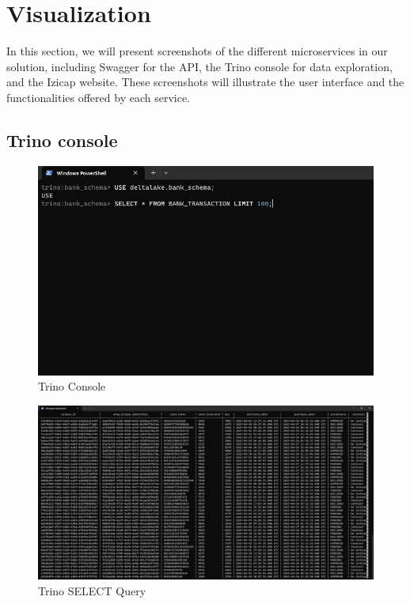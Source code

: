 \section{Visualization}

In this section, we will present screenshots of the different microservices in our solution, including Swagger for the API, the Trino console for data exploration, and the Izicap website. These screenshots will illustrate the user interface and the functionalities offered by each service.

\subsection{Trino console}

\begin{figure}[H]
\centering
\includegraphics[width=\linewidth]{images/trino-1.png}
\caption{Trino Console}\label{fig:trino-1}
\end{figure}

\begin{figure}[H]
\centering
\includegraphics[width=\linewidth]{images/trino-2.png}
\caption{Trino SELECT Query}\label{fig:trino-2}
\end{figure}

